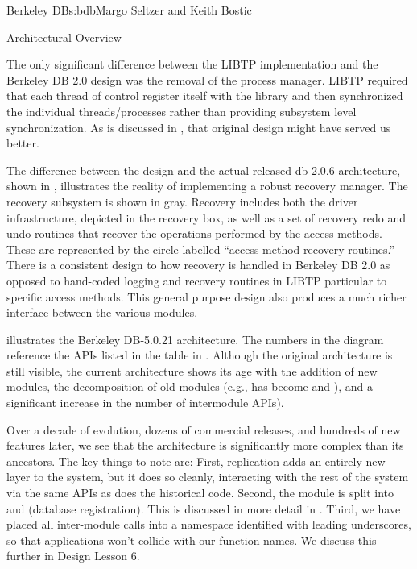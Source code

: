 \begin{aosachapter}{Berkeley DB}{s:bdb}{Margo Seltzer and Keith Bostic}
\begin{aosasect1}{Architectural Overview}


The only significant difference between the LIBTP implementation and
the Berkeley DB 2.0 design was the removal of the process
manager. LIBTP required that each thread of control register itself with the
library and then synchronized the individual threads/processes rather
than providing subsystem level synchronization. As is discussed in
, that original design might have served us
better.


The difference between the design and the actual released db-2.0.6
architecture, shown in , illustrates the
reality of implementing a robust recovery manager. The recovery
subsystem is shown in gray. Recovery includes both the driver
infrastructure, depicted in the recovery box, as well as a set of
recovery redo and undo routines that recover the operations performed
by the access methods. These are represented by the circle labelled
``access method recovery routines.'' There is a consistent design to
how recovery is handled in Berkeley DB 2.0 as opposed to hand-coded
logging and recovery routines in LIBTP particular to specific
access methods.  This
general purpose design also produces a much richer interface between
the various modules.

 illustrates the Berkeley DB-5.0.21
architecture.  The numbers in the diagram reference the APIs listed
in the table in . Although the original
architecture is still visible, the current architecture shows its age
with the addition of new modules, the decomposition of old modules
(e.g.,  has become  and ), and a 
significant increase in
the number of intermodule APIs).

Over a decade of evolution, dozens of commercial releases, and
hundreds of new features later, we see that the architecture is
significantly more complex than its ancestors.  The key things to note
are: First, replication adds an entirely new layer to the system, but
it does so cleanly, interacting with the rest of the system via the
same APIs as does the historical code.  Second, the  module is
split into  and  (database registration).  This is discussed
in more detail in .  Third, we have placed all
inter-module calls into a namespace identified with leading
underscores, so that applications won't collide with our function
names. We discuss this further in Design Lesson 6.


\end{aosasect1}
\end{aosachapter}
